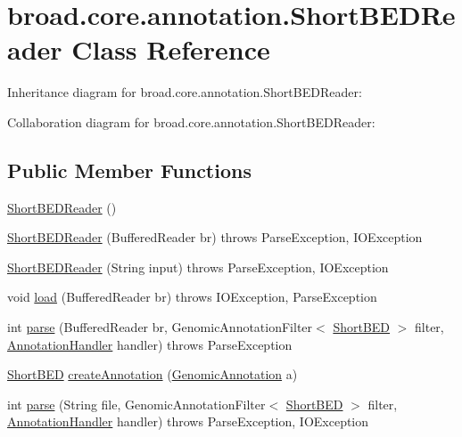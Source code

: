 \hypertarget{classbroad_1_1core_1_1annotation_1_1_short_b_e_d_reader}{\section{broad.\+core.\+annotation.\+Short\+B\+E\+D\+Reader Class Reference}
\label{classbroad_1_1core_1_1annotation_1_1_short_b_e_d_reader}
}


Inheritance diagram for broad.\+core.\+annotation.\+Short\+B\+E\+D\+Reader\+:


Collaboration diagram for broad.\+core.\+annotation.\+Short\+B\+E\+D\+Reader\+:
\subsection*{Public Member Functions}
\begin{DoxyCompactItemize}
\item 
\hyperlink{classbroad_1_1core_1_1annotation_1_1_short_b_e_d_reader_a8d7aa5d63e299eb76ab40d3c1d822d06}{Short\+B\+E\+D\+Reader} ()
\item 
\hyperlink{classbroad_1_1core_1_1annotation_1_1_short_b_e_d_reader_ac00ab05074e66fd78288cb5d63711565}{Short\+B\+E\+D\+Reader} (Buffered\+Reader br)  throws Parse\+Exception, I\+O\+Exception 
\item 
\hyperlink{classbroad_1_1core_1_1annotation_1_1_short_b_e_d_reader_a27937953532e95d4e350e256bb5d5aee}{Short\+B\+E\+D\+Reader} (String input)  throws Parse\+Exception, I\+O\+Exception 
\item 
void \hyperlink{classbroad_1_1core_1_1annotation_1_1_short_b_e_d_reader_a388529ce93a1df991565139352252ee9}{load} (Buffered\+Reader br)  throws I\+O\+Exception, Parse\+Exception 
\item 
int \hyperlink{classbroad_1_1core_1_1annotation_1_1_short_b_e_d_reader_ac1bb1544b80da36a6f4d227fac600c13}{parse} (Buffered\+Reader br, Genomic\+Annotation\+Filter$<$ \hyperlink{classbroad_1_1core_1_1annotation_1_1_short_b_e_d}{Short\+B\+E\+D} $>$ filter, \hyperlink{interfacebroad_1_1core_1_1annotation_1_1_annotation_handler}{Annotation\+Handler} handler)  throws Parse\+Exception 
\item 
\hyperlink{classbroad_1_1core_1_1annotation_1_1_short_b_e_d}{Short\+B\+E\+D} \hyperlink{classbroad_1_1core_1_1annotation_1_1_short_b_e_d_reader_a7540cff50bedf34657b60da407c3228e}{create\+Annotation} (\hyperlink{interfacebroad_1_1core_1_1annotation_1_1_genomic_annotation}{Genomic\+Annotation} a)
\item 
int \hyperlink{classbroad_1_1core_1_1annotation_1_1_short_b_e_d_reader_a026835951b48bfef3cc8e3739294522e}{parse} (String file, Genomic\+Annotation\+Filter$<$ \hyperlink{classbroad_1_1core_1_1annotation_1_1_short_b_e_d}{Short\+B\+E\+D} $>$ filter, \hyperlink{interfacebroad_1_1core_1_1annotation_1_1_annotation_handler}{Annotation\+Handler} handler)  throws Parse\+Exception, I\+O\+Exception 
\end{DoxyCompactItemize}


